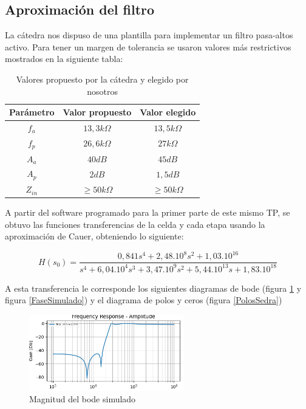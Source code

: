 \subsection{Aproximación del filtro}

La cátedra nos dispuso de una plantilla para implementar un filtro pasa-altos activo. Para tener un margen de tolerancia se usaron valores más restrictivos mostrados en la siguiente tabla:

\begin{table}[h]
\begin{tabular}{@{}|c|c|c|@{}}
\toprule
\textbf{Parámetro} & \textbf{Valor propuesto} & \textbf{Valor elegido} \\ \midrule
$f_a$              & $13,3k\Omega$              & $13,5k\Omega$            \\
$f_p$              & $26,6k\Omega$              & $27k\Omega$              \\
$A_a$              & $40dB$                     & $45dB$      			   \\
$A_p$              & $2dB$                      & $1,5dB$				   \\
$Z_{in}$           & $\geq50k\Omega$            & $\geq50k\Omega$           
\end{tabular}
\centering
\caption{Valores propuesto por la cátedra y elegido por nosotros}
\label{tabla componentes}
\end{table}

A partir del software programado para la primer parte de este mismo TP, se obtuvo las funciones transferencias de la celda y cada etapa usando la aproximación de Cauer, obteniendo lo siguiente:

\begin{equation}
H(s_0) = \frac{0,841 s^4 + 2,48.10^8 s^2 + 1,03.10^{16}}{s^4 + 6,04.10^4 s^3 + 3,47.10^9 s^2 + 5,44.10^{13} s + 1,83.10^{18}}
\end{equation}

A esta transferencia le corresponde los siguientes diagramas de bode (figura \ref{BodeSimulado} y figura \ref{FaseSimulado}) y el diagrama de polos y ceros (figura \ref{PolosSedra})

\begin{figure}[h]
	\includegraphics[width=0.6\textwidth]{../Ejercicio2-DisenoDeCeldas/3CeldaSedra/Imagenes/MagnitudSedra.png}
	\centering
	\caption{Magnitud del bode simulado}
	\label{BodeSimulado}
\end{figure}

